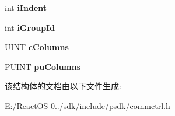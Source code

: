 \begin{DoxyCompactItemize}
\mbox{\label{structtag_l_v_i_t_e_m_a_a469c6ea2a40a4c33a18529fcde662969}} 
int {\bfseries i\+Indent}
\item 
\mbox{\label{structtag_l_v_i_t_e_m_a_a45eeb8ff59c7cfee64ea4069c21bf1a8}} 
int {\bfseries i\+Group\+Id}
\item 
\mbox{\label{structtag_l_v_i_t_e_m_a_aaf6cc3bb6927b2c209e66085231e3059}} 
U\+I\+NT {\bfseries c\+Columns}
\item 
\mbox{\label{structtag_l_v_i_t_e_m_a_a0ac0b570ea4e256d7a7004c2b4aa3491}} 
P\+U\+I\+NT {\bfseries pu\+Columns}
\end{DoxyCompactItemize}


该结构体的文档由以下文件生成\+:\begin{DoxyCompactItemize}
\item 
E\+:/\+React\+O\+S-\/0../sdk/include/psdk/commctrl.\+h\end{DoxyCompactItemize}
